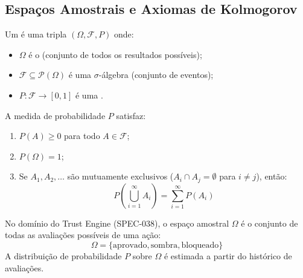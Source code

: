 \subsection{Espaços Amostrais e Axiomas de Kolmogorov}
\begin{definicao}
Um  é uma tripla $(\Omega, \mathcal{F},
P)$ onde:
\begin{itemize}
\item $\Omega$ é o  (conjunto de todos os
resultados possíveis);
\item $\mathcal{F} \subseteq \mathcal{P}(\Omega)$ é uma
$\sigma$-álgebra (conjunto de eventos);
\item $P: \mathcal{F} \to [0,1]$ é uma .
\end{itemize}
\end{definicao}
\begin{definicao}
A medida de probabilidade $P$ satisfaz:
\begin{enumerate}
\item $P(A) \geq 0$ para todo $A \in \mathcal{F}$;
\item $P(\Omega) = 1$;
\item Se $A_1, A_2, \ldots$ são mutuamente exclusivos
($A_i \cap A_j = \emptyset$ para $i \neq j$), então:
\[P\left(\bigcup_{i=1}^{\infty} A_i\right) =
\sum_{i=1}^{\infty} P(A_i)
\]
\end{enumerate}
\end{definicao}
\begin{exemplo}
No domínio do Trust Engine (SPEC-038), o espaço amostral $\Omega$ é o
conjunto de todas as avaliações possíveis de uma ação:
\[\Omega = \{\text{aprovado}, \text{sombra}, \text{bloqueado}\}
\]
A distribuição de probabilidade $P$ sobre $\Omega$ é estimada a partir
do histórico de avaliações.
\end{exemplo}
